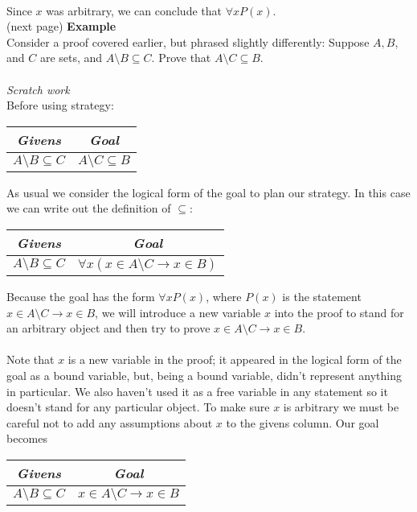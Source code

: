 \documentclass{report}
\theoremstyle{definition}
\begin{document}
\indent{}\\
\indent Since $x$ was arbitrary, we can conclude that $\forall xP(x)$.\\
(next page)\newpage
\noindent\textbf{Example}\\
Consider a proof covered earlier, but phrased slightly differently: Suppose $A,B$, and $C$ are sets, and $A\setminus B\subseteq C$. Prove that $A\setminus C\subseteq B$.\\
\vspace{1mm}\\
\textit{Scratch work}\\
Before using strategy:
\begin{center}
\begin{tabular}{c|c}
\textit{Givens}&\textit{Goal}\\
\hline
$A\setminus B\subseteq C$&$A\setminus C\subseteq B$
\end{tabular}
\end{center}
As usual we consider the logical form of the goal to plan our strategy. In this case we can write out the definition of $\subseteq$:
\begin{center}
\begin{tabular}{c|c}
\textit{Givens}&\textit{Goal}\\
\hline
$A\setminus B\subseteq C$&$\forall x(x\in A\setminus C\to x\in B)$
\end{tabular}
\end{center}
Because the goal has the form $\forall xP(x)$, where $P(x)$ is the statement $x\in A\setminus C\to x\in B$, we will introduce a new variable $x$ into the proof to stand for an arbitrary object
and then try to prove $x\in A\setminus C\to x\in B$.\\
\vspace{1mm}\\
Note that $x$ is a new variable in the proof; it appeared in the logical form of the goal as a bound variable, but, being a bound variable, didn't represent anything in particular. 
We also haven't used it as a free variable in any statement so it doesn't stand for any particular object. To make sure $x$ is arbitrary we must be careful not to add any assumptions
about $x$ to the givens column. Our goal becomes
\begin{center}
\begin{tabular}{c|c}
\textit{Givens}&\textit{Goal}\\
\hline
$A\setminus B\subseteq C$&$x\in A\setminus C\to x\in B$
\end{tabular}
\end{center}
\end{document}
